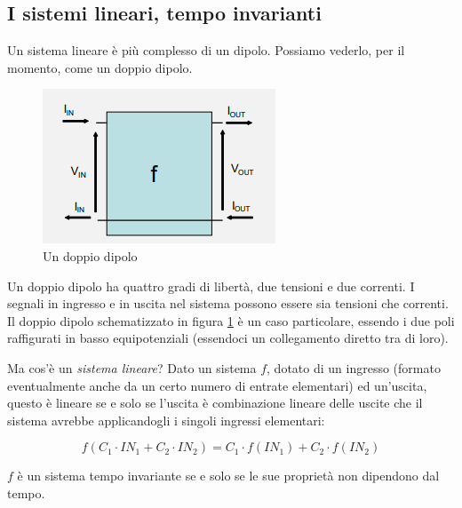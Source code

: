 \documentclass{article}
\begin{document}
\clearpage












\subsection{I sistemi lineari, tempo invarianti}

Un sistema lineare è più complesso di un dipolo. Possiamo vederlo, per il momento, come un doppio dipolo.

\begin{figure}[h]
  \centering
  \includegraphics[scale=0.7]{IM_doppio_dipolo}
  \caption{Un doppio dipolo}
  \label{Schema_doppio_dipolo}
\end{figure}

Un doppio dipolo ha quattro gradi di libertà, due tensioni e due correnti. I segnali in ingresso e in uscita nel sistema possono essere sia tensioni che correnti. Il doppio dipolo schematizzato in figura \ref{Schema_doppio_dipolo} è un caso particolare, essendo i due poli raffigurati in basso equipotenziali (essendoci un collegamento diretto tra di loro). 

\vspace{3mm}

Ma cos'è un \textit{sistema lineare}? Dato un sistema $f$, dotato di un ingresso (formato eventualmente anche da un certo numero di entrate elementari) ed un'uscita, questo è lineare se e solo se l'uscita è combinazione lineare delle uscite che il sistema avrebbe applicandogli i singoli ingressi elementari:

\[f(C_1 \cdot IN_1 + C_2 \cdot IN_2) = C_1 \cdot f(IN_1) + C_2 \cdot f(IN_2)\]

$f$ è un sistema tempo invariante se e solo se le sue proprietà non dipendono dal tempo.

\vspace{3mm}
\end{document}
